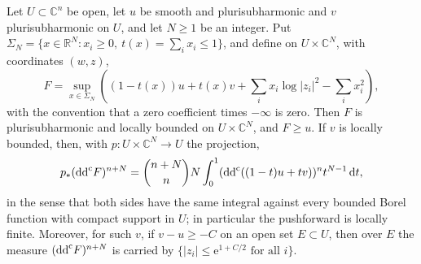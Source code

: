 \begin{lemma}\label{lem:projective-simplex-fibre-formula}
Let $U\subset\mathbb C^n$ be open, let $u$ be smooth and plurisubharmonic and $v$ plurisubharmonic on $U$, and let $N\geq1$ be an integer. Put $\Sigma_N=\{x\in\mathbb R^N:x_i\geq0,\ t(x)=\sum_i x_i\leq1\}$, and define on $U\times\mathbb C^N$, with coordinates $(w,z)$,
\[
 F=\sup_{x\in\Sigma_N}
       \left((1-t(x))u+t(x)v+
                    \sum_i x_i\log|z_i|^2-\sum_i x_i^2\right),
\]
with the convention that a zero coefficient times $-\infty$ is zero. Then $F$ is plurisubharmonic and locally bounded on $U\times\mathbb C^N$, and $F\geq u$. If $v$ is locally bounded, then, with $p\colon U\times\mathbb C^N\to U$ the projection,
\begin{equation}\label{eq:projective-simplex-fibre-formula}
 p_*(\mathrm{dd}^{\mathrm{c}} F)^{n+N}
       =\binom{n+N}{n}N\int_0^1
                (\mathrm{dd}^{\mathrm{c}}((1-t)u+tv))^n t^{N-1}\,\mathrm dt,
\end{equation}
in the sense that both sides have the same integral against every bounded Borel function with compact support in $U$; in particular the pushforward is locally finite. Moreover, for such $v$, if $v-u\geq-C$ on an open set $E\subset U$, then over $E$ the measure $(\mathrm{dd}^{\mathrm{c}} F)^{n+N}$ is carried by $\{|z_i|\leq\mathrm e^{1+C/2}\text{ for all }i\}$.
\end{lemma}
